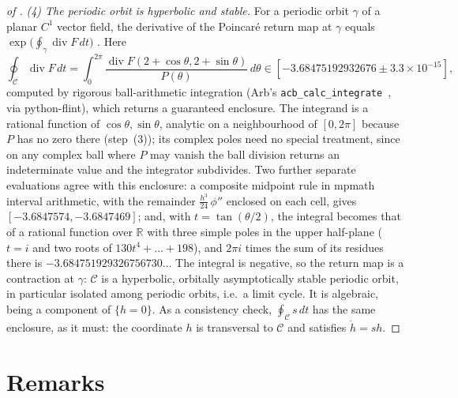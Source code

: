 \documentclass[11pt,a4paper]{report}
\begin{document}
\begin{proof}[of ]
\emph{(4) The periodic orbit is hyperbolic and stable.} For a periodic orbit \(\gamma\) of a planar \(C^1\) vector
field, the derivative of the Poincaré return map at \(\gamma\) equals \(\exp\bigl(\oint_\gamma\operatorname{div}F\,dt\bigr)\)
\autocite[§3.4, Theorem~2]{Perko2001}. Here
\[
\oint_{\mathcal C}\operatorname{div}F\,dt=\int_0^{2\pi}\frac{\operatorname{div}F(2+\cos\theta,2+\sin\theta)}{P(\theta)}\,d\theta
\in[-3.68475192932676\pm3.3\times10^{-15}],
\]
computed by rigorous ball-arithmetic integration (Arb's \texttt{acb\_calc\_integrate}~\autocite{Johansson2018}, via
python-flint), which returns a guaranteed enclosure. The integrand is a rational function of \(\cos\theta,\sin\theta\),
analytic on a neighbourhood of \([0,2\pi]\) because \(P\) has no zero there (step~(3)); its complex poles need no
special treatment, since on any complex ball where \(P\) may vanish the ball division returns an indeterminate value
and the integrator subdivides. Two further separate evaluations agree with this enclosure: a composite midpoint
rule in mpmath interval arithmetic, with the remainder \(\tfrac{h^3}{24}\,\phi''\) enclosed on each cell, gives
\([-3.6847574,-3.6847469]\); and, with \(t=\tan(\theta/2)\), the integral becomes that of a rational function over
\(\mathbb R\) with three simple poles in the upper half-plane (\(t=i\) and two roots of \(130t^4+\dots+198\)), and
\(2\pi i\) times the sum of its residues there is \(-3.684751929326756730\ldots\) The integral is negative, so the return map is a contraction at
\(\gamma\): \(\mathcal C\) is
a hyperbolic, orbitally asymptotically stable periodic orbit, in particular isolated among periodic orbits, i.e.\ a
limit cycle. It is algebraic, being a component of \(\{h=0\}\). As a consistency check, \(\oint_{\mathcal C}s\,dt\)
has the same enclosure, as it must: the coordinate \(h\) is transversal to \(\mathcal C\) and satisfies \(\dot h=sh\).
\end{proof}

\section{Remarks}
\end{document}
